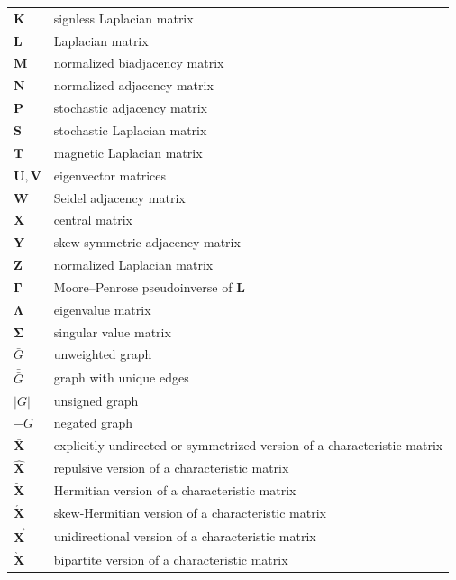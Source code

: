 \documentclass{article}
\begin{document}
\begin{longtable}{ll}
  $\mathbf K$ & signless Laplacian matrix \\
  $\mathbf L$ & Laplacian matrix \\
  $\mathbf M$ & normalized biadjacency matrix \\
  $\mathbf N$ & normalized adjacency matrix \\
  $\mathbf P$ & stochastic adjacency matrix \\
  $\mathbf S$ & stochastic Laplacian matrix \\
  $\mathbf T$ & magnetic Laplacian matrix \\
  $\mathbf U, \mathbf V$ & eigenvector matrices \\
  $\mathbf W$ & Seidel adjacency matrix \\
  $\mathbf X$ & central matrix \\
  $\mathbf Y$ & skew-symmetric adjacency matrix \\
  $\mathbf Z$ & normalized Laplacian matrix \\
  \midrule
  $\mathbf \Gamma$ & Moore--Penrose pseudoinverse of $\mathbf L$ \\
  $\mathbf \Lambda$ & eigenvalue matrix \\
  $\mathbf \Sigma$ & singular value matrix \\
  \midrule
  $\bar G$ & unweighted graph \\
  $\bar{\bar G}$ & graph with unique edges \\
  $|G|$ & unsigned graph \\ 
  $-G$  & negated graph \\
  \midrule
  $\bar{\mathbf X}$   & explicitly undirected or symmetrized version of a characteristic matrix \\
  $\hat{\mathbf X}$   & repulsive version of a characteristic matrix \\
  $\breve{\mathbf X}$ & Hermitian version of a characteristic matrix \\
  $\acute{\mathbf X}$ & skew-Hermitian version of a characteristic matrix \\
  $\vec{\mathbf X}$   & unidirectional version of a characteristic matrix \\
  $\grave{\mathbf X}$ & bipartite version of a characteristic matrix \\
\end{longtable}
\end{document}
